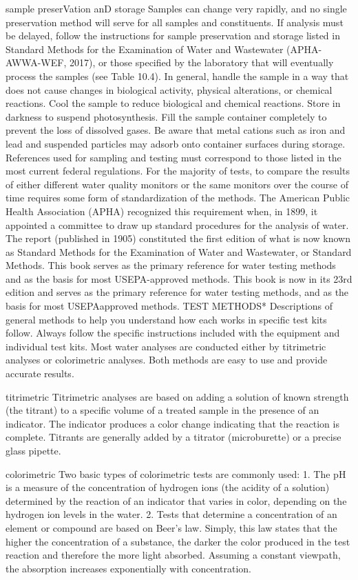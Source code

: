\documentclass{article}
\begin{document}
sample preserVation anD storage Samples can change very rapidly, and no
single preservation method will serve for all samples and constituents.
If analysis must be delayed, follow the instructions for sample
preservation and storage listed in Standard Methods for the Examination
of Water and Wastewater (APHA-AWWA-WEF, 2017), or those specified by the
laboratory that will eventually process the samples (see Table 10.4). In
general, handle the sample in a way that does not cause changes in
biological activity, physical alterations, or chemical reactions. Cool
the sample to reduce biological and chemical reactions. Store in
darkness to suspend photosynthesis. Fill the sample container completely
to prevent the loss of dissolved gases. Be aware that metal cations such
as iron and lead and suspended particles may adsorb onto container
surfaces during storage. References used for sampling and testing must
correspond to those listed in the most current federal regulations. For
the majority of tests, to compare the results of either different water
quality monitors or the same monitors over the course of time requires
some form of standardization of the methods. The American Public Health
Association (APHA) recognized this requirement when, in 1899, it
appointed a committee to draw up standard procedures for the analysis of
water. The report (published in 1905) constituted the first edition of
what is now known as Standard Methods for the Examination of Water and
Wastewater, or Standard Methods. This book serves as the primary
reference for water testing methods and as the basis for most
USEPA-approved methods. This book is now in its 23rd edition and serves
as the primary reference for water testing methods, and as the basis for
most USEPAapproved methods. TEST METHODS* Descriptions of general
methods to help you understand how each works in specific test kits
follow. Always follow the specific instructions included with the
equipment and individual test kits. Most water analyses are conducted
either by titrimetric analyses or colorimetric analyses. Both methods
are easy to use and provide accurate results.

titrimetric Titrimetric analyses are based on adding a solution of known
strength (the titrant) to a specific volume of a treated sample in the
presence of an indicator. The indicator produces a color change
indicating that the reaction is complete. Titrants are generally added
by a titrator (microburette) or a precise glass pipette.

colorimetric Two basic types of colorimetric tests are commonly used: 1.
The pH is a measure of the concentration of hydrogen ions (the acidity
of a solution) determined by the reaction of an indicator that varies in
color, depending on the hydrogen ion levels in the water. 2. Tests that
determine a concentration of an element or compound are based on Beer's
law. Simply, this law states that the higher the concentration of a
substance, the darker the color produced in the test reaction and
therefore the more light absorbed. Assuming a constant viewpath, the
absorption increases exponentially with concentration.
\end{document}
